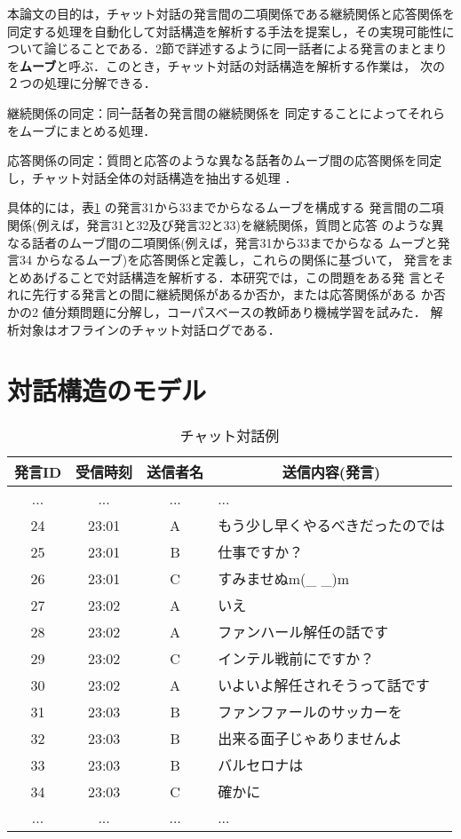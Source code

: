 本論文の目的は，チャット対話の発言間の二項関係である継続関係と応答関係を
同定する処理を自動化して対話構造を解析する手法を提案し，その実現可能性に
ついて論じることである．2節で詳述するように同一話者による発言のまとまり
を{\bf ムーブ}と呼ぶ．このとき，チャット対話の対話構造を解析する作業は，
次の２つの処理に分解できる．

\begin{description}

\item{\boldmath $継続関係の同定：$}\.同\.一\.話\.者の発言間の継続関係を
同定することによってそれらをムーブにまとめる処理．

\item{\boldmath $応答関係の同定：$}質問と応答のような\.異\.な\.る\.話\.
者のムーブ間の応答関係を同定し，チャット対話全体の対話構造を抽出する処理
．

\end{description}

具体的には，表\ref{tbl:chat} の発言31から33までからなるムーブを構成する
発言間の二項関係(例えば，発言31と32及び発言32と33)を継続関係，質問と応答
のような異なる話者のムーブ間の二項関係(例えば，発言31から33までからなる
ムーブと発言34 からなるムーブ)を応答関係と定義し，これらの関係に基づいて，
発言をまとめあげることで対話構造を解析する．本研究では，この問題をある発
言とそれに先行する発言との間に継続関係があるか否か，または応答関係がある
か否かの2 値分類問題に分解し，コーパスベースの教師あり機械学習を試みた．
解析対象はオフラインのチャット対話ログである．
\section{対話構造のモデル}

\begin{table}[tbt]
  \begin{center}
    \caption{チャット対話例}
    \label{tbl:chat}
    \begin{tabular}{cccl}
      \hline
      \hline
      発言ID & 受信時刻 & 送信者名 & \multicolumn{1}{c}{送信内容(発言)} \\
      \hline
      ...&...&...&...\\
       24&23:01&A&もう少し早くやるべきだったのでは\\
       25&23:01&B&仕事ですか？\\
       26&23:01&C&すみませぬm(\_ \_)m\\
       27&23:02&A&いえ\\
       28&23:02&A&ファンハール解任の話です\\ 
       29&23:02&C&インテル戦前にですか？\\
       30&23:02&A&いよいよ解任されそうって話です\\
       31&23:03&B&ファンファールのサッカーを\\
       32&23:03&B&出来る面子じゃありませんよ\\
       33&23:03&B&バルセロナは\\ 
       34&23:03&C&確かに\\
      ...&...&...&...\\
      \hline
    \end{tabular}
  \end{center}
\end{table}

